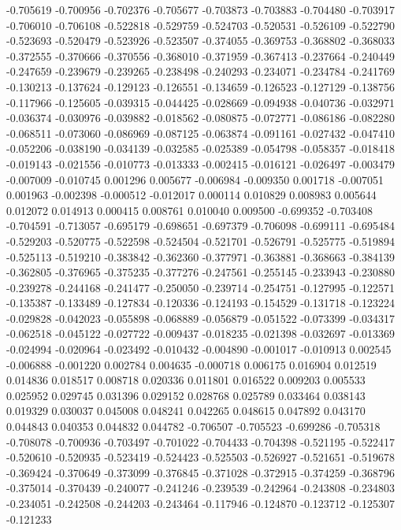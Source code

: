 -0.705619
-0.700956
-0.702376
-0.705677
-0.703873
-0.703883
-0.704480
-0.703917
-0.706010
-0.706108
-0.522818
-0.529759
-0.524703
-0.520531
-0.526109
-0.522790
-0.523693
-0.520479
-0.523926
-0.523507
-0.374055
-0.369753
-0.368802
-0.368033
-0.372555
-0.370666
-0.370556
-0.368010
-0.371959
-0.367413
-0.237664
-0.240449
-0.247659
-0.239679
-0.239265
-0.238498
-0.240293
-0.234071
-0.234784
-0.241769
-0.130213
-0.137624
-0.129123
-0.126551
-0.134659
-0.126523
-0.127129
-0.138756
-0.117966
-0.125605
-0.039315
-0.044425
-0.028669
-0.094938
-0.040736
-0.032971
-0.036374
-0.030976
-0.039882
-0.018562
-0.080875
-0.072771
-0.086186
-0.082280
-0.068511
-0.073060
-0.086969
-0.087125
-0.063874
-0.091161
-0.027432
-0.047410
-0.052206
-0.038190
-0.034139
-0.032585
-0.025389
-0.054798
-0.058357
-0.018418
-0.019143
-0.021556
-0.010773
-0.013333
-0.002415
-0.016121
-0.026497
-0.003479
-0.007009
-0.010745
0.001296
0.005677
-0.006984
-0.009350
0.001718
-0.007051
0.001963
-0.002398
-0.000512
-0.012017
0.000114
0.010829
0.008983
0.005644
0.012072
0.014913
0.000415
0.008761
0.010040
0.009500
-0.699352
-0.703408
-0.704591
-0.713057
-0.695179
-0.698651
-0.697379
-0.706098
-0.699111
-0.695484
-0.529203
-0.520775
-0.522598
-0.524504
-0.521701
-0.526791
-0.525775
-0.519894
-0.525113
-0.519210
-0.383842
-0.362360
-0.377971
-0.363881
-0.368663
-0.384139
-0.362805
-0.376965
-0.375235
-0.377276
-0.247561
-0.255145
-0.233943
-0.230880
-0.239278
-0.244168
-0.241477
-0.250050
-0.239714
-0.254751
-0.127995
-0.122571
-0.135387
-0.133489
-0.127834
-0.120336
-0.124193
-0.154529
-0.131718
-0.123224
-0.029828
-0.042023
-0.055898
-0.068889
-0.056879
-0.051522
-0.073399
-0.034317
-0.062518
-0.045122
-0.027722
-0.009437
-0.018235
-0.021398
-0.032697
-0.013369
-0.024994
-0.020964
-0.023492
-0.010432
-0.004890
-0.001017
-0.010913
0.002545
-0.006888
-0.001220
0.002784
0.004635
-0.000718
0.006175
0.016904
0.012519
0.014836
0.018517
0.008718
0.020336
0.011801
0.016522
0.009203
0.005533
0.025952
0.029745
0.031396
0.029152
0.028768
0.025789
0.033464
0.038143
0.019329
0.030037
0.045008
0.048241
0.042265
0.048615
0.047892
0.043170
0.044843
0.040353
0.044832
0.044782
-0.706507
-0.705523
-0.699286
-0.705318
-0.708078
-0.700936
-0.703497
-0.701022
-0.704433
-0.704398
-0.521195
-0.522417
-0.520610
-0.520935
-0.523419
-0.524423
-0.525503
-0.526927
-0.521651
-0.519678
-0.369424
-0.370649
-0.373099
-0.376845
-0.371028
-0.372915
-0.374259
-0.368796
-0.375014
-0.370439
-0.240077
-0.241246
-0.239539
-0.242964
-0.243808
-0.234803
-0.234051
-0.242508
-0.244203
-0.243464
-0.117946
-0.124870
-0.123712
-0.125307
-0.121233
